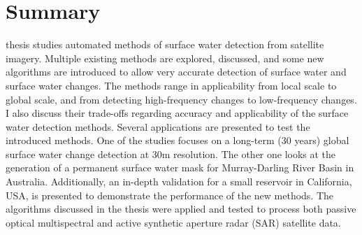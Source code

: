 \chapter*{Summary}

 thesis studies automated methods of surface water detection from satellite imagery. Multiple existing methods are explored, discussed, and some new algorithms are introduced to allow very accurate detection of surface water and surface water changes. 
The methods range in applicability from local scale to global scale, and from detecting high-frequency changes to low-frequency changes. 
I also discuss their trade-offs regarding accuracy and applicability of the surface water detection methods. Several applications are presented to test the introduced methods. One of the studies focuses on a long-term (30 years) global surface water change detection at 30m resolution. The other one looks at the generation of a permanent surface water mask for Murray-Darling River Basin in Australia. Additionally, an in-depth validation for a small reservoir in California, USA, is presented to demonstrate the performance of the new methods. 
The algorithms discussed in the thesis were applied and tested to process both passive optical multispectral and active synthetic aperture radar (SAR) satellite data.